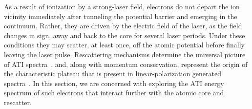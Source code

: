 As a result of ionization by a strong-laser field, electrons do not
depart the ion vicinity immediately after tunneling the potential
barrier and emerging in the continuum. Rather, they are driven by the
electric field of the laser, as the field changes in sign, away and
back to the core for several laser periods. Under these conditions
they may scatter, at least once, off the atomic potential before
finally leaving the laser pulse. Rescattering mechanisms determine the
universal picture of ATI
spectra~\cite{Becker_rescattering1994,Walker_1996,BeckerRescattering_2018},
and, along with momentum conservation, represent the origin of the
characteristic plateau that is present in linear-polarization
generated spectra~\cite{PRL72ATIplateau}. In this section, we are
concerned with exploring the ATI energy spectrum of such electrons
that interact further with the atomic core and rescatter.


